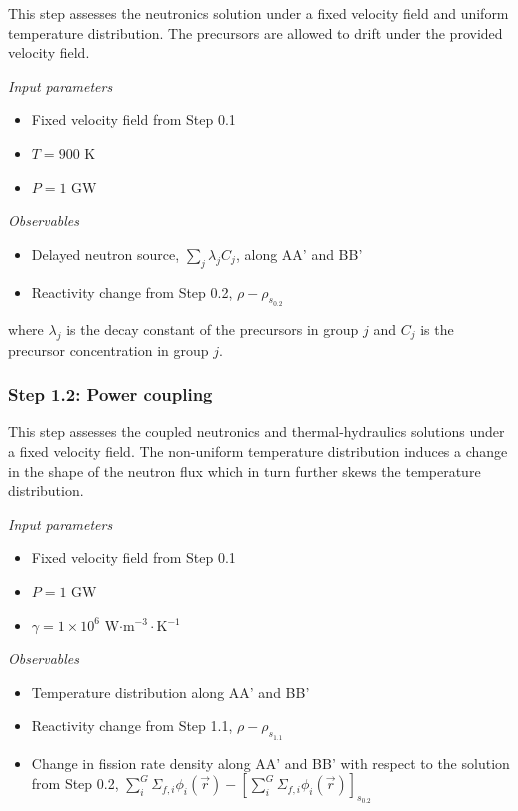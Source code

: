 This step assesses the neutronics solution under a fixed velocity field and
uniform temperature distribution. The precursors are allowed to drift under the
provided velocity field.

\textit{Input parameters}
%
\begin{itemize}
    \item Fixed velocity field from Step 0.1
    \item $T = 900$ K
    \item $P = 1$ GW
\end{itemize}

\textit{Observables}
\begin{itemize}
    \item Delayed neutron source, $\sum_j \lambda_j C_j$, along AA' and BB'
    \item Reactivity change from Step 0.2, $\rho - \rho_{s_{0.2}}$
\end{itemize}
where $\lambda_j$ is the decay constant of the precursors in group $j$ and
$C_j$ is the precursor concentration in group $j$.

\subsubsection{Step 1.2: Power coupling}

This step assesses the coupled neutronics and thermal-hydraulics solutions
under a fixed velocity field. The non-uniform temperature distribution induces
a change in the shape of the neutron flux which in turn further skews the
temperature distribution.

\textit{Input parameters}
%
\begin{itemize}
    \item Fixed velocity field from Step 0.1
    \item $P = 1$ GW
    \item $\gamma = 1 \times 10^6$ W$\cdot$m$^{-3}\cdot$K$^{-1}$
\end{itemize}

\textit{Observables}
\begin{itemize}
    \item Temperature distribution along AA' and BB'
    \item Reactivity change from Step 1.1, $\rho - \rho_{s_{1.1}}$
    \item Change in fission rate density along AA' and BB' with respect to the
    solution from Step 0.2, $\sum^G_i \Sigma_{f,i} \phi_i(\vec{r}) -
    \left[\sum^G_i \Sigma_{f,i} \phi_i(\vec{r})\right]_{s_{0.2}}$
\end{itemize}

